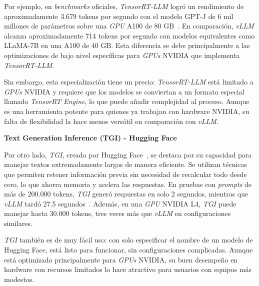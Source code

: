 Por ejemplo, en \textit{benchmarks} oficiales, \textit{TensorRT-LLM} logró un rendimiento de aproximadamente 3.679 tokens por segundo con el modelo GPT-J de 6 mil millones de parámetros sobre una \textit{GPU} A100 de 80 GB~\cite{ref13}. En comparación, \textit{vLLM} alcanza aproximadamente 714 tokens por segundo con modelos equivalentes como LLaMA-7B en una A100 de 40 GB. Esta diferencia se debe principalmente a las optimizaciones de bajo nivel específicas para \textit{GPUs} NVIDIA que implementa \textit{TensorRT-LLM}.

Sin embargo, esta especialización tiene un precio: \textit{TensorRT-LLM} está limitado a \textit{GPUs} NVIDIA y requiere que los modelos se conviertan a un formato especial llamado \textit{TensorRT Engine}, lo que puede añadir complejidad al proceso. Aunque es una herramienta potente para quienes ya trabajan con hardware NVIDIA, su falta de flexibilidad la hace menos versátil en comparación con \textit{vLLM}.

\vspace{0.5cm}
\noindent\textbf{Text Generation Inference (TGI) - Hugging Face}

Por otro lado, \textit{TGI}, creado por Hugging Face~\cite{ref14}, se destaca por su capacidad para manejar textos extremadamente largos de manera eficiente. Se utilizan técnicas que permiten retener información previa sin necesidad de recalcular todo desde cero, lo que ahorra memoria y acelera las respuestas. En pruebas con \textit{prompts} de más de 200.000 tokens, \textit{TGI} generó respuestas en solo 2 segundos, mientras que \textit{vLLM} tardó 27.5 segundos~\cite{ref15}. Además, en una \textit{GPU} NVIDIA L4, \textit{TGI} puede manejar hasta 30.000 tokens, tres veces más que \textit{vLLM} en configuraciones similares.

\textit{TGI} también es de muy fácil uso: con solo especificar el nombre de un modelo de Hugging Face, está listo para funcionar, sin configuraciones complicadas. Aunque está optimizado principalmente para \textit{GPUs} NVIDIA, su buen desempeño en hardware con recursos limitados lo hace atractivo para usuarios con equipos más modestos.

